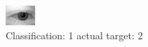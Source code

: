 \begin{figure}[h!]
\begin{center}
\includegraphics[width=0.60\columnwidth]{figures/ID503_class_1_target_2.png}
\end{center}
\caption{ Classification: 1 actual target: 2}
\label{fig:ID503_class_1_target_2}
\end{figure}
